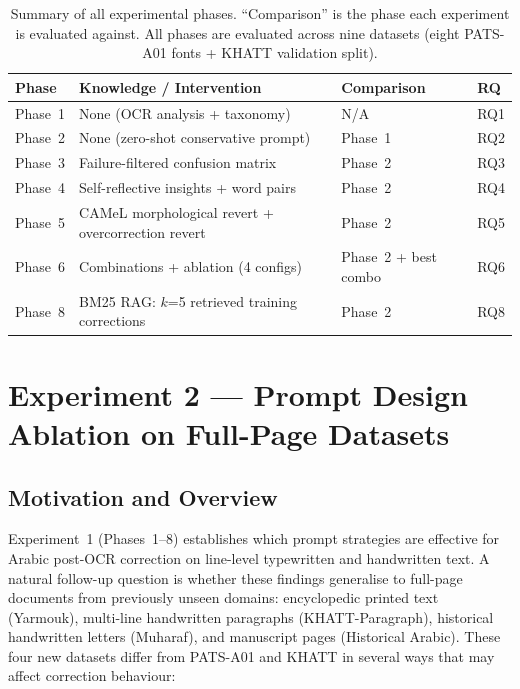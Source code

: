 \begin{table}[ht]
\caption{Summary of all experimental phases. ``Comparison'' is the phase each
         experiment is evaluated against. All phases are evaluated across nine
         datasets (eight PATS-A01 fonts + KHATT validation split).}
\label{tab:phase_summary}
\centering
\renewcommand{\arraystretch}{1.3}
\begin{tabularx}{\linewidth}{lXll}
\toprule
\textbf{Phase} & \textbf{Knowledge / Intervention} & \textbf{Comparison} & \textbf{RQ} \\
\midrule
Phase~1  & None (OCR analysis + taxonomy)         & N/A      & RQ1 \\
Phase~2  & None (zero-shot conservative prompt)   & Phase~1  & RQ2 \\
Phase~3  & Failure-filtered confusion matrix       & Phase~2  & RQ3 \\
Phase~4  & Self-reflective insights + word pairs  & Phase~2  & RQ4 \\
Phase~5  & CAMeL morphological revert + overcorrection revert & Phase~2 & RQ5 \\
Phase~6  & Combinations + ablation (4 configs)    & Phase~2 + best combo & RQ6 \\
Phase~8  & BM25 RAG: $k$=5 retrieved training corrections & Phase~2 & RQ8 \\
\bottomrule
\end{tabularx}
\end{table}

\section{Experiment 2 --- Prompt Design Ablation on Full-Page Datasets}
\label{sec:exp2}

\subsection{Motivation and Overview}
\label{subsec:exp2_motivation}

Experiment~1 (Phases~1--8) establishes which prompt strategies are effective
for Arabic post-OCR correction on line-level typewritten and handwritten text.
A natural follow-up question is whether these findings generalise to
full-page documents from previously unseen domains: encyclopedic printed
text (Yarmouk), multi-line handwritten paragraphs (KHATT-Paragraph),
historical handwritten letters (Muharaf), and manuscript pages (Historical
Arabic). These four new datasets differ from PATS-A01 and KHATT in several
ways that may affect correction behaviour:

